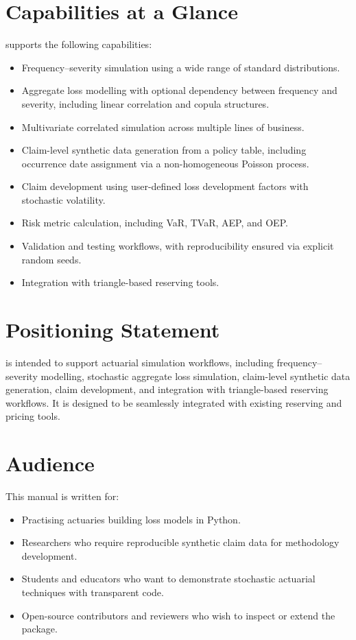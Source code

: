 \section{Capabilities at a Glance}

\actsim supports the following capabilities:

\begin{itemize}[leftmargin=*]
    \item Frequency--severity simulation using a wide range of standard
          distributions.
    \item Aggregate loss modelling with optional dependency between
          frequency and severity, including linear correlation and copula
          structures.
    \item Multivariate correlated simulation across multiple lines of
          business.
    \item Claim-level synthetic data generation from a policy table,
          including occurrence date assignment via a non-homogeneous
          Poisson process.
    \item Claim development using user-defined loss development factors
          with stochastic volatility.
    \item Risk metric calculation, including VaR, TVaR, AEP, and OEP.
    \item Validation and testing workflows, with reproducibility ensured
          via explicit random seeds.
    \item Integration with triangle-based reserving tools.
\end{itemize}

\section{Positioning Statement}

\actsim is intended to support actuarial simulation workflows, including
frequency--severity modelling, stochastic aggregate loss simulation,
claim-level synthetic data generation, claim development, and integration
with triangle-based reserving workflows. It is designed to be seamlessly 
integrated with existing reserving and pricing tools.

\section{Audience}

This manual is written for:

\begin{itemize}[leftmargin=*]
    \item Practising actuaries building loss models in Python.
    \item Researchers who require reproducible synthetic claim data for
          methodology development.
    \item Students and educators who want to demonstrate stochastic
          actuarial techniques with transparent code.
    \item Open-source contributors and reviewers who wish to inspect or
          extend the package.
\end{itemize}

